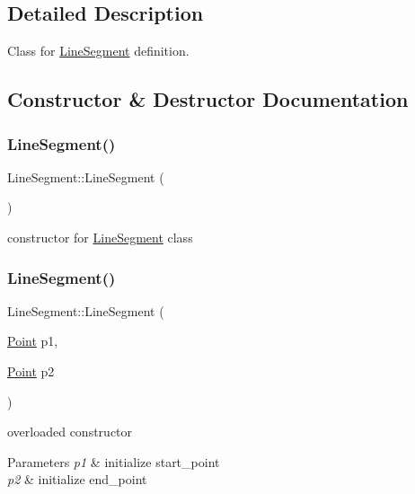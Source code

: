 \subsection{Detailed Description}
Class for \mbox{\hyperlink{class_line_segment}{Line\+Segment}} definition. 

\subsection{Constructor \& Destructor Documentation}
\mbox{\label{class_line_segment_a4c2da2ff2d3979f28bfcb24948a8e6a9}} 
\subsubsection{\texorpdfstring{LineSegment()}{LineSegment()}\hspace{0.1cm}{\footnotesize\ttfamily [1/2]}}
{\footnotesize\ttfamily Line\+Segment\+::\+Line\+Segment (\begin{DoxyParamCaption}{ }\end{DoxyParamCaption})}

constructor for \mbox{\hyperlink{class_line_segment}{Line\+Segment}} class \mbox{\label{class_line_segment_a691e185edf3aa7e2dc12307f9ef4be6b}} 
\subsubsection{\texorpdfstring{LineSegment()}{LineSegment()}\hspace{0.1cm}{\footnotesize\ttfamily [2/2]}}
{\footnotesize\ttfamily Line\+Segment\+::\+Line\+Segment (\begin{DoxyParamCaption}\item[{\mbox{\hyperlink{class_point}{Point}}}]{p1,  }\item[{\mbox{\hyperlink{class_point}{Point}}}]{p2 }\end{DoxyParamCaption})}

overloaded constructor 
\begin{DoxyParams}{Parameters}
{\em p1} & initialize start\+\_\+point \\
\hline
{\em p2} & initialize end\+\_\+point \\
\hline
\end{DoxyParams}


